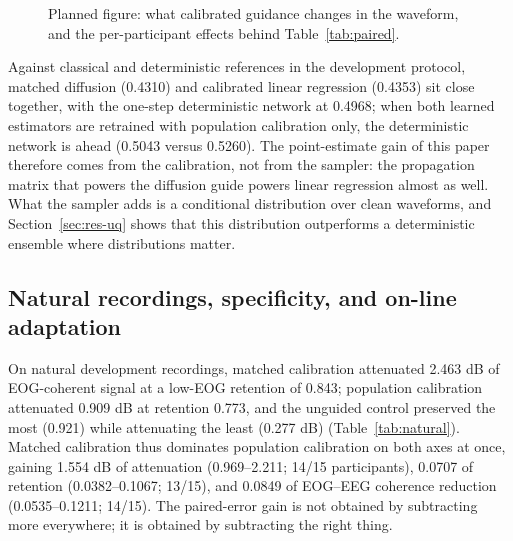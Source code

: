\begin{figure}[t]
  \centering
  \caption{Planned figure: what calibrated guidance changes in the waveform, and the per-participant effects behind Table~\ref{tab:paired}.}
  \label{fig:denoise}
\end{figure}

Against classical and deterministic references in the development protocol, matched diffusion (0.4310) and calibrated linear regression (0.4353) sit close together, with the one-step deterministic network at 0.4968; when both learned estimators are retrained with population calibration only, the deterministic network is ahead (0.5043 versus 0.5260). The point-estimate gain of this paper therefore comes from the calibration, not from the sampler: the propagation matrix that powers the diffusion guide powers linear regression almost as well. What the sampler adds is a conditional distribution over clean waveforms, and Section~\ref{sec:res-uq} shows that this distribution outperforms a deterministic ensemble where distributions matter.

\subsection{Natural recordings, specificity, and on-line adaptation}
\label{sec:res-natural}

On natural development recordings, matched calibration attenuated 2.463 dB of EOG-coherent signal at a low-EOG retention of 0.843; population calibration attenuated 0.909 dB at retention 0.773, and the unguided control preserved the most (0.921) while attenuating the least (0.277 dB) (Table~\ref{tab:natural}). Matched calibration thus dominates population calibration on both axes at once, gaining 1.554 dB of attenuation (0.969--2.211; 14/15 participants), 0.0707 of retention (0.0382--0.1067; 13/15), and 0.0849 of EOG--EEG coherence reduction (0.0535--0.1211; 14/15). The paired-error gain is not obtained by subtracting more everywhere; it is obtained by subtracting the right thing.

